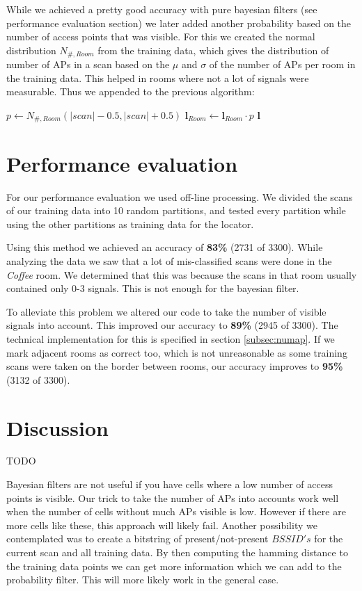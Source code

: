 \documentclass[a4paper,10pt,twoside]{IEEEtran}
\begin{document}
While we achieved a pretty good accuracy with pure bayesian filters (see performance evaluation section) we later added another probability based on the number of access points that was visible.
For this we created the normal distribution $N_{\#,Room}$ from the training data, which gives the distribution of number of APs in a scan based on the $\mu$ and $\sigma$ of the number of APs per room in the training data.
This helped in rooms where not a lot of signals were measurable. Thus we appended to the previous algorithm:
\begin{algorithmic}
			\State $p \gets N_{\#,Room}(|scan|-0.5,|scan|+0.5)$
			\State $\mathbf{l}_{Room} \gets \mathbf{l}_{Room} \cdot p $
		\EndFor
		\State {} $\mathbf{l}$
	\EndIf
\end{algorithmic}


\section{Performance evaluation}
\label{sec:evaluation}

For our performance evaluation we used off-line processing. We divided the scans of our training data into 10 random partitions, and tested every partition while using the other partitions as training data for the locator.

Using this method we achieved an accuracy of \textbf{83\%} (2731 of 3300).
While analyzing the data we saw that a lot of mis-classified scans were done in the \emph{Coffee} room.
We determined that this was because the scans in that room usually contained only 0-3 signals.
This is not enough for the bayesian filter.

To alleviate this problem we altered our code to take the number of visible signals into account.
This improved our accuracy to \textbf{89\%} (2945 of 3300).
The technical implementation for this is specified in section \ref{subsec:numap}.
If we mark adjacent rooms as correct too, which is not unreasonable as some training scans were taken on the border between rooms, our accuracy improves to \textbf{95\%} (3132 of 3300).

\newpage

\section{Discussion}
\label{sec:discussion}
TODO

Bayesian filters are not useful if you have cells where a low number of access points is visible.
Our trick to take the number of APs into accounts work well when the number of cells without much APs visible is low.
However if there are more cells like these, this approach will likely fail.
Another possibility we contemplated was to create a bitstring of present/not-present $BSSID's$ for the current scan and all training data.
By then computing the hamming distance to the training data points we can get more information which we can add to the probability filter.
This will more likely work in the general case.




%
%

\newpage
\appendix
\end{document}
